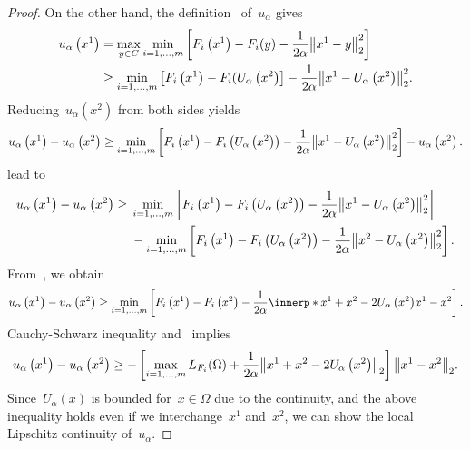 \documentclass[../../main]{subfiles}
\begin{document}
\begin{proof}
    On the other hand, the definition~ of~$u_\alpha$ gives
    \begin{align}
        u_\alpha\left(x^1\right) &= \max_{y \in C} \min_{i = 1, \dots, m} \left[ F_i\left(x^1\right) - F_i(y) - \frac{1}{2 \alpha} \norm*{x^1 - y}_2^2 \right] \\
                      &\ge \min_{i = 1, \dots, m} \left[F_i\left(x^1\right) - F_i(U_\alpha\left(x^2\right)\right] - \frac{1}{2 \alpha} \norm*{x^1 - U_\alpha\left(x^2\right)}_2^2
    .\end{align}
    Reducing~$u_\alpha\left(x^2\right)$ from both sides yields
    \begin{equation}
        u_\alpha\left(x^1\right) - u_\alpha\left(x^2\right) \ge \min_{i = 1, \dots, m} \left[F_i\left(x^1\right) - F_i\left(U_\alpha\left(x^2\right)\right) - \frac{1}{2 \alpha} \norm*{x^1 - U_\alpha\left(x^2\right)}_2^2\right] - u_\alpha\left(x^2\right)
    .\end{equation} 
     lead to
    \begin{align}
        u_\alpha\left(x^1\right) - u_\alpha\left(x^2\right) \ge{}& \min_{i = 1, \dots, m} \left[F_i\left(x^1\right) - F_i\left(U_\alpha\left(x^2\right)\right) - \frac{1}{2 \alpha} \norm*{x^1 - U_\alpha\left(x^2\right)}_2^2\right] \\
    &- \min_{i = 1, \dots, m} \left[F_i\left(x^1\right) - F_i\left(U_\alpha\left(x^2\right)\right) - \frac{1}{2 \alpha} \norm*{x^2 - U_\alpha\left(x^2\right)}_2^2 \right]
    .\end{align}
    From~, we obtain
    \begin{equation}
        u_\alpha\left(x^1\right) - u_\alpha\left(x^2\right) \ge \min_{i = 1, \dots, m} \left[ F_i\left(x^1\right) - F_i\left(x^2\right) - \frac{1}{2 \alpha} \innerp*{x^1 + x^2 - 2 U_\alpha\left(x^2\right)}{x^1 - x^2} \right] 
    .\end{equation} 
    Cauchy-Schwarz inequality and~ implies
    \begin{equation}
        u_\alpha\left(x^1\right) - u_\alpha\left(x^2\right) \ge - \left[ \max_{i = 1, \dots, m} L_{F_i}(\Omega) + \frac{1}{2 \alpha} \norm*{x^1 + x^2 - 2 U_\alpha\left(x^2\right)}_2\right] \norm*{x^1 - x^2}_2
    .\end{equation} 
    Since~$U_\alpha(x)$ is bounded for~$x \in \Omega$ due to the continuity, and the above inequality holds even if we interchange~$x^1$ and~$x^2$, we can show the local Lipschitz continuity of~$u_\alpha$.
\end{proof}
\end{document}
